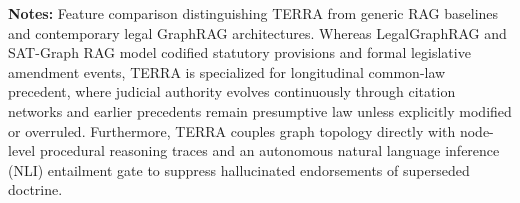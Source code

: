 \begin{table}[!t]
{\begin{tabular}{p{2.5cm}p{3.5cm}p{3.8cm}p{3.8cm}p{3.8cm}p{3.2cm}}
\bottomrule
\end{tabular}%
}
\vspace{1mm}
\raggedright \footnotesize \textbf{Notes:} Feature comparison distinguishing TERRA from generic RAG baselines and contemporary legal GraphRAG architectures. Whereas LegalGraphRAG \citep{chen2026legalgraphrag} and SAT-Graph RAG \citep{demartim2025satgraphrag} model codified statutory provisions and formal legislative amendment events, TERRA is specialized for longitudinal common-law precedent, where judicial authority evolves continuously through citation networks and earlier precedents remain presumptive law unless explicitly modified or overruled. Furthermore, TERRA couples graph topology directly with node-level procedural reasoning traces and an autonomous natural language inference (NLI) entailment gate to suppress hallucinated endorsements of superseded doctrine.
\end{table}
